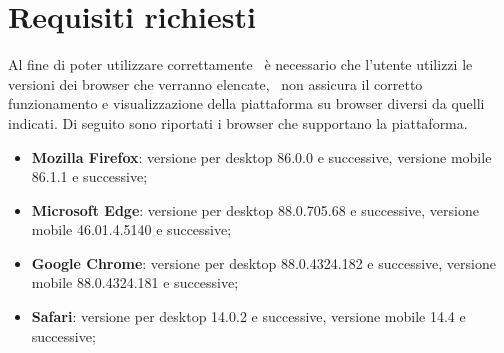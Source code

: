 \section{Requisiti richiesti}\label{Requisiti}
Al fine di poter utilizzare correttamente \NomeProgetto\ è necessario che l'utente utilizzi le versioni dei browser che verranno elencate, \Gruppo\ non assicura il corretto funzionamento e visualizzazione della piattaforma su browser diversi da quelli indicati.
Di seguito sono riportati i browser che supportano la piattaforma.
\begin{itemize}
	\item \textbf{Mozilla Firefox}: versione per desktop 86.0.0 e successive, versione mobile 86.1.1 e successive; 
	\item \textbf{Microsoft Edge}: versione per desktop 88.0.705.68 e successive, versione mobile 46.01.4.5140 e successive;
	\item \textbf{Google Chrome}: versione per desktop 88.0.4324.182 e successive, versione mobile 88.0.4324.181 e successive;
	\item \textbf{Safari}: versione per desktop 14.0.2 e successive, versione mobile 14.4 e successive; 
\end{itemize}